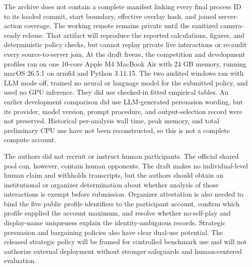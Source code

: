 The archive does not contain a complete manifest linking every final process
ID to its loaded commit, start boundary, effective overlay hash, and joined
server-action coverage. The working remote remains private until the sanitized
camera-ready release. That artifact will reproduce the reported calculations,
figures, and deterministic policy checks, but cannot replay private live
interactions or re-audit every source-to-server join. At the draft freeze, the competition and
development profiles ran on one 10-core Apple M4 MacBook Air with 24 GB memory, running
macOS 26.5.1 on arm64 and Python 3.11.15. The two audited windows ran with LLM
mode off, trained no neural or language model for the submitted policy, and used
no GPU inference. They did use checked-in fitted empirical tables. An earlier development
comparison did use LLM-generated persuasion wording, but its provider, model
version, prompt procedure, and output-selection record were not preserved.
Historical per-analysis
wall time, peak memory, and total preliminary CPU use have not been
reconstructed, so this is not a complete compute account.

The authors did not recruit or instruct human participants. The official shared
pool can, however, contain human opponents. The draft makes no individual-level
human claim and withholds transcripts, but the authors should obtain an
institutional or organizer determination about whether analysis of those
interactions is exempt before submission. Organizer attestation is also needed
to bind the five public profile identifiers to the participant account, confirm
which profile supplied the account maximum, and resolve whether no-self-play
and display-name uniqueness explain the identity-ambiguous records. Strategic persuasion and bargaining
policies also have clear dual-use potential. The released strategic policy will
be framed for controlled benchmark use and will not authorize external
deployment without stronger safeguards and human-centered evaluation.
